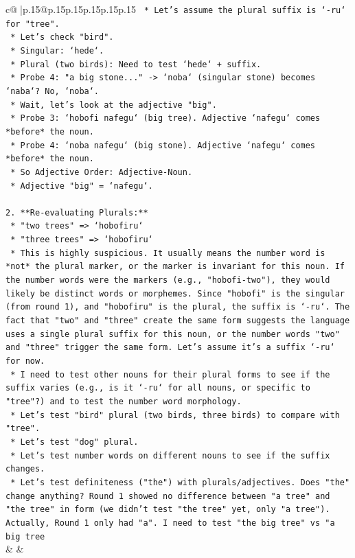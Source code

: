 \documentclass{article}
\begin{document}
{\begin{supertabular}{c@{$\;$}|p{.15\linewidth}@{}p{.15\linewidth}p{.15\linewidth}p{.15\linewidth}p{.15\linewidth}p{.15\linewidth}}
{{{\texttt{            *   Let's assume the plural suffix is `{-}ru` for "tree".} \\
\texttt{            *   Let's check "bird".} \\
\texttt{                *   Singular: `hede`.} \\
\texttt{                *   Plural (two birds): Need to test `hede` + suffix.} \\
\texttt{                *   Probe 4: "a big stone..." {-}> `noba` (singular stone) becomes `naba`? No, `noba`.} \\
\texttt{                *   Wait, let's look at the adjective "big".} \\
\texttt{                *   Probe 3: `hobofi nafegu` (big tree). Adjective `nafegu` comes *before* the noun.} \\
\texttt{                *   Probe 4: `noba nafegu` (big stone). Adjective `nafegu` comes *before* the noun.} \\
\texttt{                *   So Adjective Order: Adjective{-}Noun.} \\
\texttt{                *   Adjective "big" = `nafegu`.} \\
\\ 
\texttt{2.  **Re{-}evaluating Plurals:**} \\
\texttt{    *   "two trees" => `hobofiru`} \\
\texttt{    *   "three trees" => `hobofiru`} \\
\texttt{    *   This is highly suspicious. It usually means the number word is *not* the plural marker, or the marker is invariant for this noun. If the number words were the markers (e.g., "hobofi{-}two"), they would likely be distinct words or morphemes. Since "hobofi" is the singular (from round 1), and "hobofiru" is the plural, the suffix is `{-}ru`. The fact that "two" and "three" create the same form suggests the language uses a single plural suffix for this noun, or the number words "two" and "three" trigger the same form. Let's assume it's a suffix `{-}ru` for now.} \\
\texttt{    *   I need to test other nouns for their plural forms to see if the suffix varies (e.g., is it `{-}ru` for all nouns, or specific to "tree"?) and to test the number word morphology.} \\
\texttt{    *   Let's test "bird" plural (two birds, three birds) to compare with "tree".} \\
\texttt{    *   Let's test "dog" plural.} \\
\texttt{    *   Let's test number words on different nouns to see if the suffix changes.} \\
\texttt{    *   Let's test definiteness ("the") with plurals/adjectives. Does "the" change anything? Round 1 showed no difference between "a tree" and "the tree" in form (we didn't test "the tree" yet, only "a tree"). Actually, Round 1 only had "a". I need to test "the big tree" vs "a big tree} \\
            }
        }
    }
    & & \\ \\


\end{supertabular}}
\end{document}

